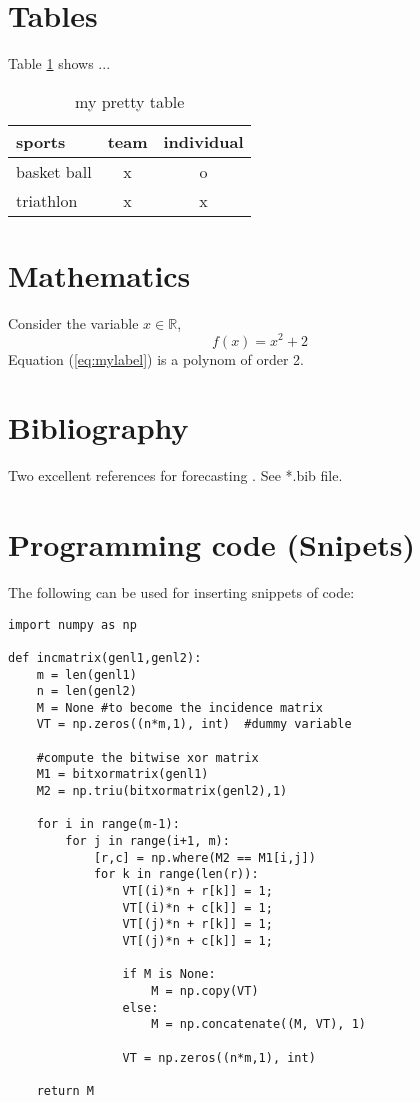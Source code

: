 \documentclass[english,a4paper,11pt,oneside,onecolumn]{book}
\begin{document}
\section{Tables}
Table \ref{tab:pretty}
 shows ...
 \begin{table}[!h]
\begin{center}
\begin{tabular}{l|c|c}
sports & team & individual \\
\hline
\hline
basket ball & x & o\\
\hline
triathlon & x & x \\
\hline
\hline
\end{tabular}
\end{center}
\caption{my pretty table} 
\label{tab:pretty}
\end{table}


\section{Mathematics}
Consider the variable $x \in \mathbb{R}$, 
\begin{equation}
f(x)=x^2+2 \label{eq:mylabel}
\end{equation}
Equation (\ref{eq:mylabel}) is a polynom of order 2.


\section{Bibliography}

Two excellent references for forecasting \cite{Goodwin2010,ST3010Dahyot2016}. 
See *.bib file.


\section{Programming code (Snipets)}
The following can be used for inserting snippets of code:

\begin{verbatim}
import numpy as np
 
def incmatrix(genl1,genl2):
    m = len(genl1)
    n = len(genl2)
    M = None #to become the incidence matrix
    VT = np.zeros((n*m,1), int)  #dummy variable
 
    #compute the bitwise xor matrix
    M1 = bitxormatrix(genl1)
    M2 = np.triu(bitxormatrix(genl2),1) 
 
    for i in range(m-1):
        for j in range(i+1, m):
            [r,c] = np.where(M2 == M1[i,j])
            for k in range(len(r)):
                VT[(i)*n + r[k]] = 1;
                VT[(i)*n + c[k]] = 1;
                VT[(j)*n + r[k]] = 1;
                VT[(j)*n + c[k]] = 1;
 
                if M is None:
                    M = np.copy(VT)
                else:
                    M = np.concatenate((M, VT), 1)
 
                VT = np.zeros((n*m,1), int)
 
    return M
\end{verbatim}
\end{document}

